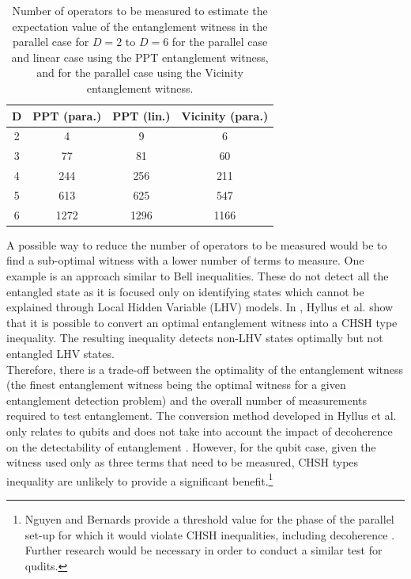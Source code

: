 \documentclass[%
 12pt,
 superscriptaddress,
 amsmath,
 amssymb,
 onecolumn,
 longbibliography
]{revtex4-2}
\begin{document}
\begin{appendices}
\begin{table}
\begin{ruledtabular}
\begin{tabular}{ cccc }
  D & PPT (para.) & PPT (lin.) & Vicinity (para.) \\
  \hline
  2 & 4 & 9 & 6  \\
  3 & 77 & 81 & 60 \\
  4 & 244 & 256 & 211\\  
  5 & 613 & 625 & 547\\
  6 & 1272 & 1296 & 1166\\  
\end{tabular}
\end{ruledtabular}
\caption{Number of operators to be measured to estimate the expectation value of the entanglement witness in the parallel case for $D=2$ to $D=6$ for the parallel case and linear case using the PPT entanglement witness, and for the parallel case using the Vicinity entanglement witness.} \label{tab:table_2}

\end{table}

\indent A possible way to reduce the number of operators to be measured would be to find a sub-optimal witness with a lower number of terms to measure. One example is an approach similar to Bell inequalities. These do not detect all the entangled state as it is focused only on identifying states which cannot be explained through Local Hidden Variable (LHV) models. In \cite{Hyllus2005}, Hyllus et al. show that it is possible to convert an optimal entanglement witness into a CHSH type inequality. The resulting inequality detects non-LHV states optimally but not entangled LHV states.\\
\indent Therefore, there is a trade-off between the optimality of the entanglement witness (the finest entanglement witness being the optimal witness for a given entanglement detection problem) and the overall number of measurements required to test entanglement. The conversion method developed in Hyllus et al. only relates to qubits and does not take into account the impact of decoherence on the detectability of entanglement \cite{Hyllus2005}. However, for the qubit case, given the witness used only as three terms that need to be measured, CHSH types inequality are unlikely to provide a significant benefit.\footnote{Nguyen and Bernards provide a threshold value for the phase of the parallel set-up for which it would violate CHSH inequalities, including decoherence \cite{Nguyen2019}. Further research would be necessary in order to conduct a similar test for qudits.}  


\end{appendices}
\end{document}
